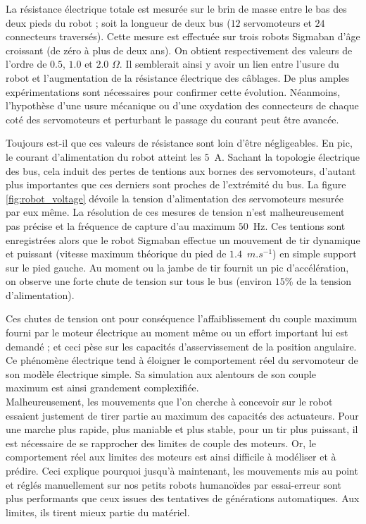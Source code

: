 La résistance électrique totale est mesurée sur le brin de masse 
entre le bas des deux pieds du robot ; soit la longueur 
de deux bus ($12$ servomoteurs et $24$ connecteurs traversés).
Cette mesure est effectuée sur trois robots Sigmaban d'âge croissant 
(de zéro à plus de deux ans).
On obtient respectivement des valeurs de l'ordre de $0.5$, $1.0$ et $2.0$ $\Omega$.
Il semblerait ainsi y avoir un lien entre l'usure du robot et l'augmentation
de la résistance électrique des câblages.
De plus amples expérimentations sont nécessaires pour confirmer cette évolution.
Néanmoins, l'hypothèse d'une usure mécanique ou d'une oxydation
des connecteurs de chaque coté des servomoteurs et perturbant le passage du courant 
peut être avancée.

Toujours est-il que ces valeurs de résistance sont loin d'être négligeables.
En pic, le courant d'alimentation du robot atteint les $5$~A.
Sachant la topologie électrique des bus, cela induit des pertes de tentions
aux bornes des servomoteurs, d'autant plus importantes que ces derniers 
sont proches de l'extrémité du bus.
La figure \ref{fig:robot_voltage} dévoile la tension d'alimentation des servomoteurs
mesurée par eux même. 
La résolution de ces mesures de tension n'est malheureusement
pas précise et la fréquence de capture d'au maximum $50$~Hz.
Ces tentions sont enregistrées alors que le robot Sigmaban
effectue un mouvement de tir dynamique et puissant (vitesse maximum théorique
du pied de $1.4$~$m.s^{-1}$) en simple support sur le pied gauche.
Au moment ou la jambe de tir fournit un pic d'accélération, on observe
une forte chute de tension sur tous le bus (environ $15$\% de la tension d'alimentation).

Ces chutes de tension ont pour conséquence l'affaiblissement du couple maximum
fourni par le moteur électrique au moment même ou un effort important lui est demandé ;
et ceci pèse sur les capacités d'asservissement de la position angulaire.
Ce phénomène électrique tend à éloigner le comportement réel du servomoteur 
de son modèle électrique simple. 
Sa simulation aux alentours de son couple maximum est ainsi grandement complexifiée.\\

Malheureusement, les mouvements que l'on cherche à concevoir sur le robot
essaient justement de tirer partie au maximum des capacités des actuateurs.
Pour une marche plus rapide, plus maniable et plus stable, pour un tir
plus puissant, il est nécessaire de se rapprocher des limites de couple
des moteurs.
Or, le comportement réel aux limites des moteurs est ainsi difficile
à modéliser et à prédire.
Ceci explique pourquoi jusqu'à maintenant, les mouvements mis au point et réglés
manuellement sur nos petits robots humanoïdes par essai-erreur sont plus performants
que ceux issues des tentatives de générations automatiques.
Aux limites, ils tirent mieux partie du matériel.

